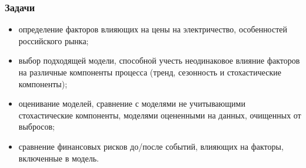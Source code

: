 \documentclass[c, dvipsnames]{beamer}  %
\begin{document}
\begin{frame}[shrink=3]
\frametitle{Задачи} 

\footnotesize{
	\begin{itemize}
		\item  определение факторов влияющих на цены на электричество, особенностей российского рынка; 	
		\item  выбор подходящей модели, способной учесть неодинаковое    влияние факторов на различные компоненты процесса (тренд, сезонность и стохастические компоненты);
		\item  оценивание моделей, сравнение с моделями не учитывающими стохастические компоненты, моделями оцененными на данных, очищенных от выбросов;
		\item  сравнение финансовых рисков до/после событий, влияющих на факторы, включенные в модель. 
	\end{itemize}
}

\end{frame}
\end{document}
